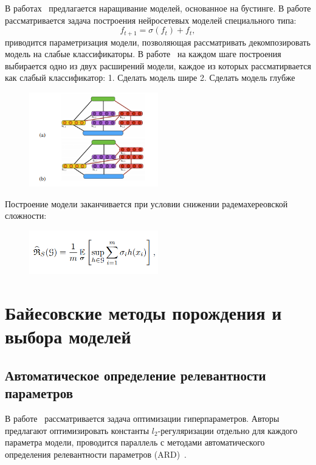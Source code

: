 В работах~\cite{boost_res, adanet} предлагается наращивание моделей, основанное на бустинге. В работе рассматривается задача построения нейросетевых моделей специального типа:
\[
    f_{t+1} = \sigma(f_t) + f_t,
\]
приводится параметризация модели, позволяющая рассматривать декомпозировать модель на слабые классификаторы.
В работе~\cite{adanet} на каждом шаге построения выбирается одно из двух расширений модели, каждое из которых рассматирвается как слабый классификатор:
1. Сделать модель шире
2. Сделать модель глубже
\begin{figure}[H]
\includegraphics[width=0.5\textwidth]{./arch_review_figs/adanet.png}
\end{figure}
Построение модели заканчивается при условии снижении радемахереовской сложности:
\begin{figure}[H]
\includegraphics[width=0.5\textwidth]{./arch_review_figs/rad.png}
\end{figure}



\section{Байесовские методы порождения и выбора моделей}
\subsection{Автоматическое определение релевантности параметров}
В работе~\cite{hyper} рассматривается задача оптимизации гиперпараметров.  Авторы предлагают оптимизировать константы $l_2$-регуляризации отдельно для каждого параметра модели, проводится параллель с методами автоматического определения релевантности параметров (ARD)~\cite{MacKay}.


